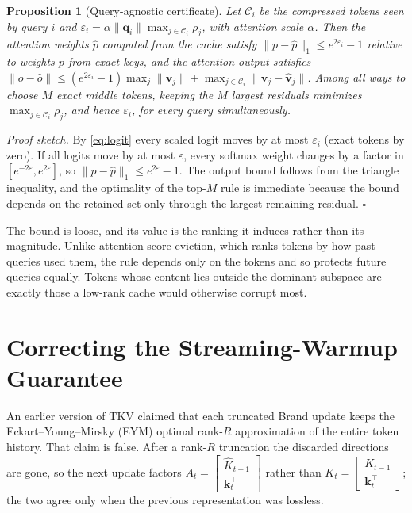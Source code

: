 \documentclass{article}
\newtheorem{proposition}{Proposition}
\begin{document}
\begin{proposition}[Query-agnostic certificate]
\label{prop:cert}
Let $\mathcal{C}_i$ be the compressed tokens seen by query $i$ and
$\varepsilon_i = \alpha\lVert\mathbf{q}_i\rVert\max_{j\in\mathcal{C}_i}\rho_j$,
with attention scale $\alpha$. Then the attention weights $\hat p$ computed
from the cache satisfy $\lVert p - \hat p\rVert_1 \le e^{2\varepsilon_i} - 1$
relative to weights $p$ from exact keys, and the attention output satisfies
$\lVert o - \hat o\rVert \le (e^{2\varepsilon_i}-1)\max_j\lVert\mathbf{v}_j\rVert
+ \max_{j\in\mathcal{C}_i}\lVert\mathbf{v}_j - \hat{\mathbf{v}}_j\rVert$. Among
all ways to choose $M$ exact middle tokens, keeping the $M$ largest residuals
minimizes $\max_{j\in\mathcal{C}_i}\rho_j$, and hence $\varepsilon_i$, for every
query simultaneously.
\end{proposition}

\emph{Proof sketch.} By \eqref{eq:logit} every scaled logit moves by at most
$\varepsilon_i$ (exact tokens by zero). If all logits move by at most
$\varepsilon$, every softmax weight changes by a factor in
$[e^{-2\varepsilon}, e^{2\varepsilon}]$, so
$\lVert p-\hat p\rVert_1 \le e^{2\varepsilon}-1$. The output bound follows from
the triangle inequality, and the optimality of the top-$M$ rule is immediate
because the bound depends on the retained set only through the largest
remaining residual. \hfill$\square$

The bound is loose, and its value is the ranking it induces rather than its
magnitude. Unlike attention-score eviction, which ranks tokens by how past
queries used them, the rule depends only on the tokens and so protects future
queries equally. Tokens whose content lies outside the dominant subspace are
exactly those a low-rank cache would otherwise corrupt most.

\section{Correcting the Streaming-Warmup Guarantee}
\label{sec:theory}

An earlier version of TKV claimed that each truncated Brand update keeps the
Eckart--Young--Mirsky (EYM) optimal rank-$R$ approximation of the entire token
history. That claim is false. After a rank-$R$ truncation the discarded
directions are gone, so the next update factors
$A_t = \begin{bmatrix}\hat K_{t-1}\\ \mathbf{k}_t^\top\end{bmatrix}$ rather than
$K_t = \begin{bmatrix}K_{t-1}\\ \mathbf{k}_t^\top\end{bmatrix}$; the two agree only
when the previous representation was lossless.
\end{document}
